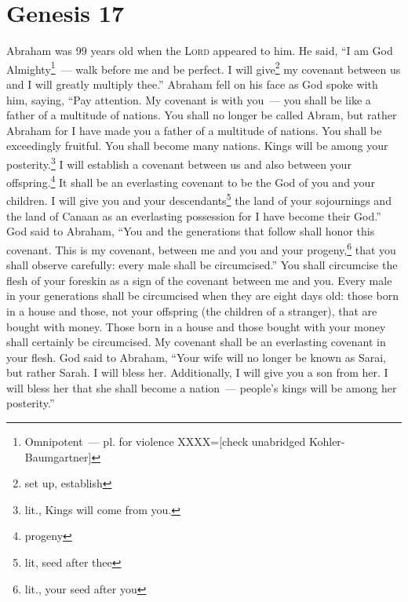 \section{Genesis 17}\label{Genesis 17}
\begin{enumerate}[align=center]
     Abraham was 99 years old when the \textsc{Lord} appeared to him. He said, ``I am God Almighty\footnote{Omnipotent~--- pl. for violence XXXX=[check unabridged Kohler-Baumgartner]}~--- walk before me and be perfect.%
     I will give\footnote{set up, establish} my covenant between us and I will greatly multiply thee.''%
     Abraham fell on his face as God spoke with him, saying,%
     ``Pay attention. My covenant is with you~--- you shall be like a father of a multitude of nations.%
     You shall no longer be called Abram, but rather Abraham for I have made you a father of a multitude of nations.%
     You shall be exceedingly fruitful. You shall become many nations. Kings will be among your posterity.\footnote{lit., Kings will come from you.}%
     I will establish a covenant between us and also between your offspring.\footnote{progeny} It shall be an everlasting covenant to be the God of you and your children.%
     I will give you and your descendants\footnote{lit, seed after thee} the land of your sojournings and the land of Canaan as an everlasting possession for I have become their God.''%
     God said to Abraham, ``You and the generations that follow shall honor this covenant.%
     This is my covenant, between me and you and your progeny,\footnote{lit., your seed after you} that you shall observe carefully: every male shall be circumcised.''%
     You shall circumcise the flesh of your foreskin as a sign of the covenant between me and you.%
     Every male in your generations shall be circumcised when they are eight days old: those born in a house and those, not your offspring (the children of a stranger), that are bought with money.%
     Those born in a house and those bought with your money shall certainly be circumcised. My covenant shall be an everlasting covenant in your flesh.%
     God said to Abraham, ``Your wife will no longer be known as Sarai, but rather Sarah.%
     I will bless her. Additionally, I will give you a son from her. I will bless her that she shall become a nation~--- people's kings will be among her posterity.''%
\end{enumerate}
